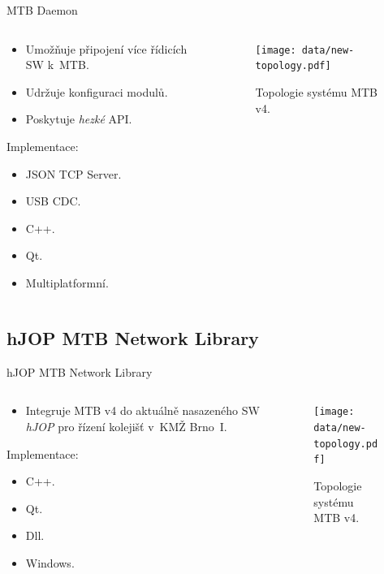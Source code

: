 \documentclass[aspectratio=169]{beamer}
\begin{document}
\begin{frame}{MTB Daemon}
\begin{columns}
	\begin{column}{.5\textwidth}
		\begin{itemize}
			\item Umožňuje připojení více řídicích SW k MTB.
			\item Udržuje konfiguraci modulů.
			\item Poskytuje \textit{hezké} API.
		\end{itemize}
		Implementace:
		\begin{itemize}
			\item JSON TCP Server.
			\item USB CDC.
			\item C++.
			\item Qt.
			\item Multiplatformní.
		\end{itemize}
	\end{column}
	\begin{column}{.5\textwidth}
		\begin{figure}
		\texttt{[image: data/new-topology.pdf]}
		\caption{Topologie systému MTB v4.}
		\end{figure}
	\end{column}
\end{columns}
\end{frame}


\subsection{hJOP MTB Network Library}

\begin{frame}{hJOP MTB Network Library}
\begin{columns}
	\begin{column}{.5\textwidth}
		\begin{itemize}
			\item Integruje MTB v4 do aktuálně nasazeného SW \textit{hJOP} pro
			řízení kolejišť v KMŽ Brno I.
		\end{itemize}
		Implementace:
		\begin{itemize}
			\item C++.
			\item Qt.
			\item Dll.
			\item Windows.
		\end{itemize}
	\end{column}
	\begin{column}{.5\textwidth}
		\begin{figure}
		\texttt{[image: data/new-topology.pdf]}
		\caption{Topologie systému MTB v4.}
		\end{figure}
	\end{column}
\end{columns}
\end{frame}
\end{document}
